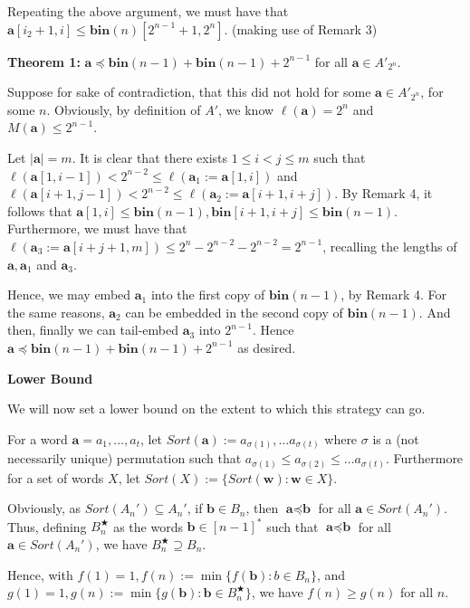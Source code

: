 \documentclass{article}
\begin{document}
Repeating the above argument, we must have that $\textbf{a}[i_2+1,i] \le \textbf{bin}(n)[2^{n-1}+1,2^n]$. (making use of Remark 3)

\textbf{Theorem 1:} $\textbf{a} \preceq \textbf{bin}(n-1)+\textbf{bin}(n-1)+2^{n-1}$ for all $\textbf{a} \in A'_{2^n}$.

Suppose for sake of contradiction, that this did not hold for some $\textbf{a} \in A'_{2^n}$, for some $n$. Obviously, by definition of $A'$, we know $\ell(\textbf{a}) = 2^n$ and $M(\textbf{a}) \le 2^{n-1}$. 

Let $|\textbf{a}| = m$. It is clear that there exists $1\le i<j \le m$ such that $\ell(\textbf{a}[1,i-1])<2^{n-2}\le \ell(\textbf{a}_1:=\textbf{a}[1,i])$ and $\ell(\textbf{a}[i+1,j-1])<2^{n-2}\le \ell(\textbf{a}_2:=\textbf{a}[i+1,i+j])$. By Remark 4, it follows that $\textbf{a}[1,i] \le \textbf{bin}(n-1),\textbf{bin}[i+1,i+j] \le \textbf{bin}(n-1)$. Furthermore, we must have that $\ell(\textbf{a}_3:=\textbf{a}[i+j+1,m]) \le 2^n-2^{n-2}-2^{n-2} = 2^{n-1}$, recalling the lengths of $\textbf{a},\textbf{a}_1$ and $\textbf{a}_3$. 

Hence, we may embed $\textbf{a}_1$ into the first copy of $\textbf{bin}(n-1)$, by Remark 4. For the same reasons, $\textbf{a}_2$ can be embedded in the second copy of $\textbf{bin}(n-1)$. And then, finally we can tail-embed $\textbf{a}_3$ into $2^{n-1}$. Hence $\textbf{a} \preceq \textbf{bin}(n-1)+\textbf{bin}(n-1)+2^{n-1}$ as desired.


\textbf{Lower Bound}

We will now set a lower bound on the extent to which this strategy can go. 

For a word $\textbf{a} = a_1, \dots, a_t$, let $Sort(\textbf{a}) := a_{\sigma(1)}, \dots a_{\sigma(t)}$ where $\sigma$ is a (not necessarily unique) permutation such that $a_{\sigma(1)}\le a_{\sigma(2)} \le  \dots a_{\sigma(t)}$. Furthermore for a set of words $X$, let $Sort(X):= \{ Sort(\textbf{w}): \textbf{w} \in X\}$.

Obviously, as $Sort(A_n') \subseteq A_n'$, if $\textbf{b} \in B_n$, then $\textbf{a} \preceq \textbf{b}$ for all $\textbf{a} \in Sort(A_n')$. Thus, defining $B_n^\bigstar $ as the words $\textbf{b} \in [n-1]^*$ such that $\textbf{a} \preceq \textbf{b}$ for all $\textbf{a} \in Sort(A_n')$, we have $B_n^\bigstar \supseteq B_n$.

Hence, with $f(1) = 1, f(n):= \min\{f(\textbf{b}): b \in B_n\}$, and $g(1) = 1, g(n) := \min\{g(\textbf{b}): \textbf{b} \in B_n^\bigstar\}$, we have $f(n) \geq g(n)$ for all $n$.
\end{document}
